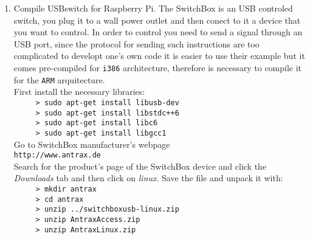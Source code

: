 \begin{enumerate}
\item Compile USBswitch for Raspberry Pi. The SwitchBox is an USB controled switch, you plug it to a wall power outlet and then conect to it a
device that you want to control. In order to control you need to send a signal through an USB port, since the protocol for sending such instructions are
too complicated to developt one's own code it is easier to use their example but it comes pre-compiled for \verb=i386= architecture, therefore is necessary
to compile it for the \verb=ARM= arquitecture.\\
First install the necessary libraries:\\
\verb=     > sudo apt-get install libusb-dev=\\
\verb=     > sudo apt-get install libstdc++6=\\
\verb=     > sudo apt-get install libc6=\\
\verb=     > sudo apt-get install libgcc1=\\
Go to SwitchBox manufacturer's webpage  \\
\verb=http://www.antrax.de=\\
Search for the product's page of the SwitchBox device and click the \emph{Downloads} tab and then click on \emph{linux}.
Save the file and unpack it with:\\
\verb=     > mkdir antrax=\\
\verb=     > cd antrax=\\
\verb=     > unzip ../switchboxusb-linux.zip=\\
\verb=     > unzip AntraxAccess.zip=\\
\verb=     > unzip AntraxLinux.zip=\\


\end{enumerate}
